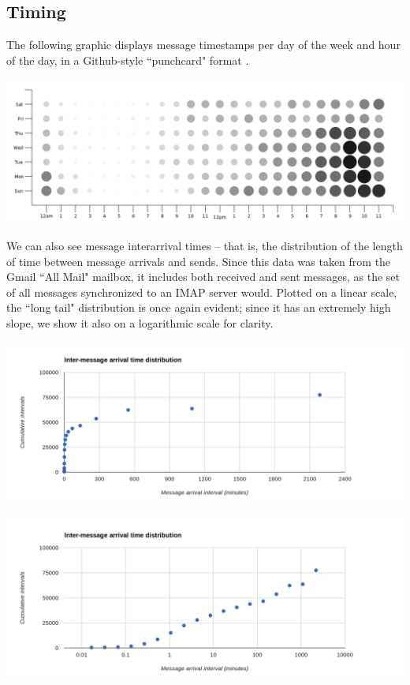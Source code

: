 \documentclass[pageno]{jpaper}
\begin{document}
\subsection{Timing}

The following graphic displays message timestamps per day of the week and hour of the day, in a Github-style ``punchcard" format \cite{punchcard}.

\includegraphics[width=\textwidth]{punchcard}

We can also see message interarrival times \--- that is, the distribution of the length of time between message arrivals and sends. Since this data was taken from the Gmail ``All Mail" mailbox, it includes both received and sent messages, as the set of all messages synchronized to an IMAP server would. Plotted on a linear scale, the ``long tail" distribution is once again evident; since it has an extremely high slope, we show it also on a logarithmic scale for clarity.

\includegraphics[width=\textwidth]{intermessagelinear}

\includegraphics[width=\textwidth]{intermessagelog}
\end{document}
